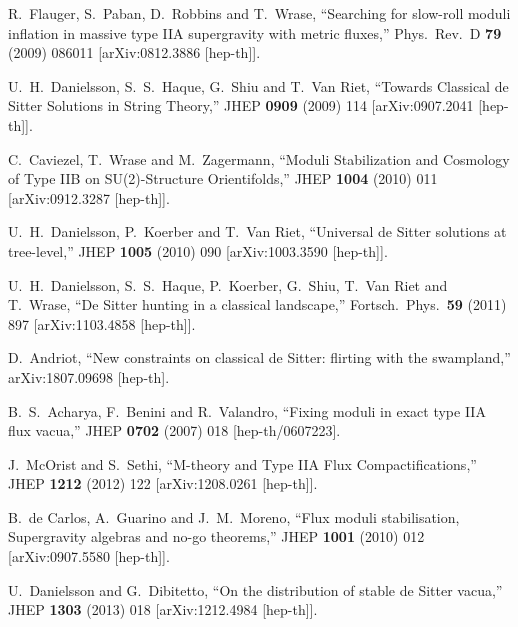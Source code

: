 \documentclass[11pt,a4paper]{article}
\begin{document}
\begin{itemize}
\begin{thebibliography}{99}
  R.~Flauger, S.~Paban, D.~Robbins and T.~Wrase,
  ``Searching for slow-roll moduli inflation in massive type IIA supergravity with metric fluxes,''
  Phys.\ Rev.\ D {\bf 79} (2009) 086011
  [arXiv:0812.3886 [hep-th]].
		
  U.~H.~Danielsson, S.~S.~Haque, G.~Shiu and T.~Van Riet,
  ``Towards Classical de Sitter Solutions in String Theory,''
  JHEP {\bf 0909} (2009) 114
  [arXiv:0907.2041 [hep-th]].
	
  C.~Caviezel, T.~Wrase and M.~Zagermann,
  ``Moduli Stabilization and Cosmology of Type IIB on SU(2)-Structure Orientifolds,''
  JHEP {\bf 1004} (2010) 011
  [arXiv:0912.3287 [hep-th]].
	
  U.~H.~Danielsson, P.~Koerber and T.~Van Riet,
  ``Universal de Sitter solutions at tree-level,''
  JHEP {\bf 1005} (2010) 090
  [arXiv:1003.3590 [hep-th]].
	
  U.~H.~Danielsson, S.~S.~Haque, P.~Koerber, G.~Shiu, T.~Van Riet and T.~Wrase,
  ``De Sitter hunting in a classical landscape,''
  Fortsch.\ Phys.\  {\bf 59} (2011) 897
  [arXiv:1103.4858 [hep-th]].
	
  D.~Andriot,
  ``New constraints on classical de Sitter: flirting with the swampland,''
  arXiv:1807.09698 [hep-th].

  B.~S.~Acharya, F.~Benini and R.~Valandro,
  ``Fixing moduli in exact type IIA flux vacua,''
  JHEP {\bf 0702} (2007) 018
  [hep-th/0607223].

  J.~McOrist and S.~Sethi,
  ``M-theory and Type IIA Flux Compactifications,''
  JHEP {\bf 1212} (2012) 122
  [arXiv:1208.0261 [hep-th]].

  B.~de Carlos, A.~Guarino and J.~M.~Moreno,
  ``Flux moduli stabilisation, Supergravity algebras and no-go theorems,''
  JHEP {\bf 1001} (2010) 012
  [arXiv:0907.5580 [hep-th]].

  U.~Danielsson and G.~Dibitetto,
  ``On the distribution of stable de Sitter vacua,''
  JHEP {\bf 1303} (2013) 018
  [arXiv:1212.4984 [hep-th]].
		

\end{thebibliography}
\end{itemize}
\end{document}
